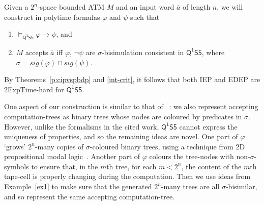 \documentclass[10pt,a4paper]{amsart}
\theoremstyle{plain}
\theoremstyle{definition}
\newcommand{\nb}[1]{\textcolor{red}{\bf!}%
	\marginpar[\parbox{15mm}{\raggedleft\scriptsize\textcolor{red}{#1}}]%
	{\parbox{15mm}{\raggedright\scriptsize\textcolor{red}{#1}}}}
\newcommand{\sig}{\mathit{sig}}
\newcommand{\FOMS}{\ensuremath{\mathsf{Q^1S5}}}
\newcommand{\inpw}{\overline{a}}
\begin{document}
	Given a $2^n$-space bounded ATM $M$ and an input word $\inpw$ of length $n$, we will 
	construct in polytime formulas  $\varphi$ and $\psi$
	such that 
	\begin{enumerate}
		\item
		$\models_{\FOMS}\varphi\to\psi$, and
		
		\item
		$M$ accepts $\inpw$ iff $\varphi$, $\neg\psi$ are $\sigma$-bisimulation consistent in $\FOMS$,
		where $\sigma=\sig(\varphi)\cap\sig(\psi)$.
	\end{enumerate}
	By Theorems~\ref{p:cipvspbdp} and \ref{int-crit},
	it follows that both IEP and EDEP are {\sc 2ExpTime}-hard for $\FOMS$.
	
	One aspect of our construction is similar to that of ~\cite{DBLP:conf/aaai/ArtaleJMOW21,DBLP:conf/lics/JungW21}: we also represent accepting computation-trees as binary trees whose nodes are coloured by  predicates in $\sigma$. However, unlike the formalisms in the cited work, \FOMS{} cannot express the uniqueness of properties, and so the remaining ideas are novel. 
	One part of $\varphi$ `grows' $2^n$-many copies of $\sigma$-coloured binary trees, using a technique from 2D propositional modal logic~\cite{DBLP:conf/time/HodkinsonKKWZ03,DBLP:journals/tocl/GollerJL15}. Another part of $\varphi$ colours the tree-nodes with non-$\sigma$-symbols to ensure that, in the $m$th tree,  for each $m<2^n$, the content of the $m$th tape-cell is properly changing during the computation. Then we use ideas from Example~\ref{ex1} to make sure that the generated $2^n$-many trees are all $\sigma$-bisimilar, and so represent the same accepting computation-tree. 
	
\end{document}
